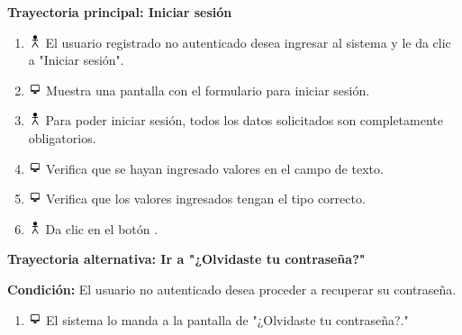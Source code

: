 \textbf{Trayectoria principal: Iniciar sesión}
\begin{enumerate}
\item \includegraphics[height=1em]{pictures/actor.png} El usuario registrado no autenticado desea ingresar al sistema y le da clic a "Iniciar sesión".
\item \includegraphics[height=1em]{pictures/sistema.png} Muestra una pantalla con el formulario para iniciar sesión.
\item \includegraphics[height=1em]{pictures/actor.png} Para poder iniciar sesión, todos los datos solicitados son completamente obligatorios.
\item \includegraphics[height=1em]{pictures/sistema.png} Verifica que se hayan ingresado valores en el campo de texto.
\item \includegraphics[height=1em]{pictures/sistema.png} Verifica que los valores ingresados tengan el tipo correcto.
\item \includegraphics[height=1em]{pictures/actor.png} Da clic en el botón .
\end{enumerate} \bigskip

\textbf{Trayectoria alternativa: Ir a "¿Olvidaste tu contraseña?"} 

\vspace{0.3em}

\textbf{Condición:} El usuario no autenticado desea proceder a recuperar su contraseña.
\begin{enumerate}
\item \includegraphics[height=1em]{pictures/sistema.png} El sistema lo manda a la pantalla de "¿Olvidaste tu contraseña?."
\end{enumerate} \bigskip

